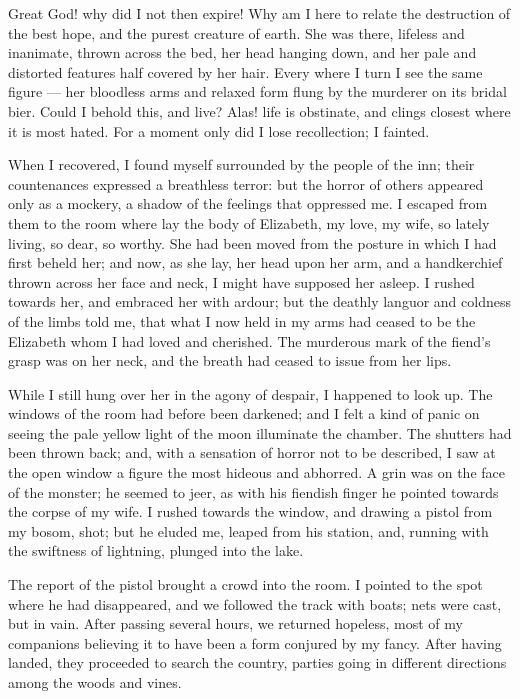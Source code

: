 Great God! why did I not then expire!
Why am I here to relate the
destruction of the best hope, and the
purest creature of earth. She was
there, lifeless and inanimate, thrown
across the bed, her head hanging down,
and her pale and distorted features half
covered by her hair. Every where I
turn I see the same figure --- her bloodless
arms and relaxed form flung by
the murderer on its bridal bier. Could
I behold this, and live? Alas! life is
obstinate, and clings closest where it
is most hated. For a moment only did
I lose recollection; I fainted.

When I recovered, I found myself
surrounded by the people of the inn;
their countenances expressed a breathless
terror: but the horror of others
appeared only as a mockery, a shadow
of the feelings that oppressed me. I
escaped from them to the room where
lay the body of Elizabeth, my love,
my wife, so lately living, so dear, so
worthy. She had been moved from
the posture in which I had first beheld
her; and now, as she lay, her head upon
her arm, and a handkerchief thrown
across her face and neck, I might have
supposed her asleep. I rushed towards
her, and embraced her with ardour; but
the deathly languor and coldness of the
limbs told me, that what I now held in
my arms had ceased to be the Elizabeth
whom I had loved and cherished. The
murderous mark of the fiend's grasp
was on her neck, and the breath had
ceased to issue from her lips.

While I still hung over her in the
agony of despair, I happened to look
up. The windows of the room had
before been darkened; and I felt a
kind of panic on seeing the pale yellow
light of the moon illuminate the chamber.
The shutters had been thrown
back; and, with a sensation of horror
not to be described, I saw at the open
window a figure the most hideous and
abhorred. A grin was on the face of the
monster; he seemed to jeer, as with his
fiendish finger he pointed towards the
corpse of my wife. I rushed towards
the window, and drawing a pistol from
my bosom, shot; but he eluded me,
leaped from his station, and, running
with the swiftness of lightning, plunged
into the lake.

The report of the pistol brought a
crowd into the room. I pointed to the
spot where he had disappeared, and we
followed the track with boats; nets were
cast, but in vain. After passing several
hours, we returned hopeless, most
of my companions believing it to have
been a form conjured by my fancy.
After having landed, they proceeded to
search the country, parties going in
different directions among the woods
and vines.

